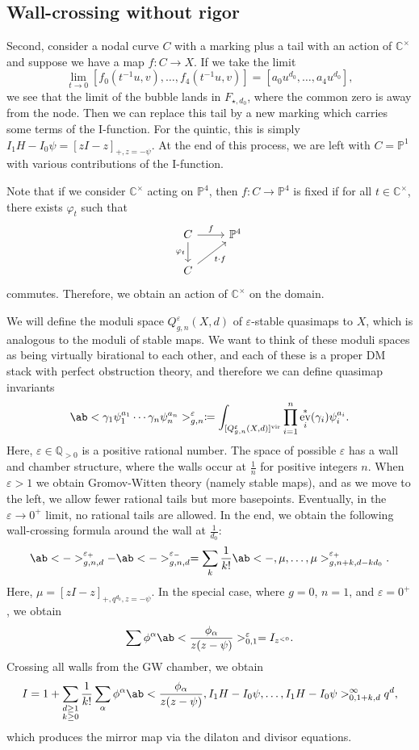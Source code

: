 \documentclass{amsart}
\theoremstyle{definition}
\theoremstyle{remark}
\theoremstyle{plain}
\theoremstyle{definition}
\theoremstyle{remark}
\newcommand{\C}{\mathbb{C}}
\newcommand{\Q}{\mathbb{Q}}
\renewcommand{\P}{\mathbb{P}}
\newcommand{\ep}{\varepsilon}
\newcommand{\mr}[1]{\mathrm{#1}}
\newcommand{\1}{\mathbf{1}}
\newcommand{\2}{\mathbf{2}}
\newcommand{\3}{\mathbf{3}}
\newcommand{\vir}{\mr{vir}}
\DeclareMathOperator{\ev}{ev}
\begin{document}
\subsection{Wall-crossing without rigor}%
\label{sub:Wall-crossing without rigor}


Second, consider a nodal curve \(C\) with a marking plus a tail with an action of \(\C^{\times}\) and suppose we have a map \(f \colon C \to X\). If we take the limit
\[ \lim_{t \to 0} [f_0(t^{-1}u, v), \ldots, f_4(t^{-1}u, v)] = [a_0 u^{d_0}, \ldots, a_4 u^{d_0}], \]
we see that the limit of the bubble lands in \(F_{\star, d_0}\), where the common zero is away from the node. Then we can replace this tail by a new marking which carries some terms of the I-function. For the quintic, this is simply \(I_1 H - I_0 \psi = [zI-z]_{+, z = -\psi}\). At the end of this process, we are left with \(C = \P^1\) with various contributions of the I-function.

Note that if we consider \(\C^{\times}\) acting on \(\P^4\), then \(f \colon C \to \P^4\) is fixed if for all \(t \in \C^{\times}\), there exists \(\varphi_t\) such that
\begin{equation*}
\begin{tikzcd}
    C \ar{r}{f} \ar{d}[swap]{\varphi_t} & \P^4 \\
    C \ar{ur}[swap]{t \cdot f}
\end{tikzcd}
\end{equation*}
commutes. Therefore, we obtain an action of \(\C^{\times}\) on the domain.

We will define the moduli space \(Q_{g,n}^{\ep}(X, d)\) of \(\ep\)-stable quasimaps to \(X\), which is analogous to the moduli of stable maps. We want to think of these moduli spaces as being virtually birational to each other, and each of these is a proper DM stack with perfect obstruction theory, and therefore we can define quasimap invariants
\[ \ab< \gamma_1 \psi_1^{a_1} \cdots \gamma_n \psi_n^{a_n}>_{g,n}^{\ep} \coloneqq \int_{[Q_{g,n}^{\ep}(X,d)]^{\vir}} \prod_{i=1}^n \ev_i^*(\gamma_i) \psi_i^{a_i}. \]
Here, \(\ep \in \Q_{>0}\) is a positive rational number. The space of possible \(\ep\) has a wall and chamber structure, where the walls occur at \(\frac{1}{n}\) for positive integers \(n\). When \(\ep > 1\) we obtain Gromov-Witten theory (namely stable maps), and as we move to the left, we allow fewer rational tails but more basepoints. Eventually, in the \(\ep \to 0^+\) limit, no rational tails are allowed. In the end, we obtain the following wall-crossing formula around the wall at \(\frac{1}{d_0}\):
\[ \ab<->_{g,n,d}^{\ep_+} - \ab<->_{g,n,d}^{\ep_-} = \sum_{k} \frac{1}{k!} \ab<-, \mu, \ldots, \mu>_{g,n+k, d-kd_0}^{\ep_+}. \]
Here, \(\mu = [zI-z]_{+, q^{d_0}, z=-\psi}\). In the special case, where \(g = 0\), \(n = 1\), and \(\ep = 0^+\), we obtain
\[ \sum \phi^{\alpha} \ab<\frac{\phi_{\alpha}}{z(z-\psi)}>^{\ep}_{0,1} = I_{z^{<0}}. \]
Crossing all walls from the GW chamber, we obtain
\[ I = 1 + \sum_{\substack{d \geq 1 \\ k \geq 0}} \frac{1}{k!} \sum_{\alpha} \phi^{\alpha} \ab< \frac{\phi_{\alpha}}{z(z-\psi)}, I_1 H - I_0 \psi, \ldots, I_1 H - I_0 \psi>_{0,1+k,d}^{\infty} q^d, \]
which produces the mirror map via the dilaton and divisor equations.
\end{document}
